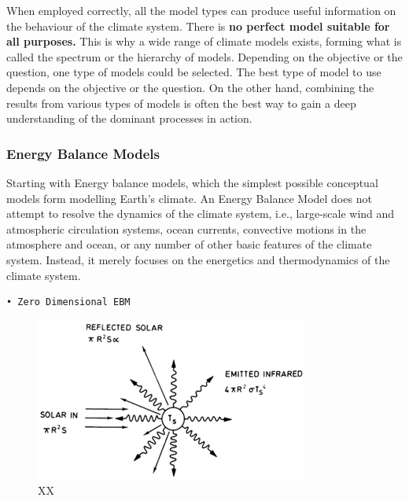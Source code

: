 \documentclass[12pt,oneside]{book}
\begin{document}
When employed correctly, all the model types can produce useful
information on the behaviour of the climate system. There is \textbf{no
perfect model suitable for all purposes.} This is why a wide range of
climate models exists, forming what is called the spectrum or the
hierarchy of models. Depending on the objective or the question, one
type of models could be selected. The best type of model to use depends
on the objective or the question. On the other hand, combining the
results from various types of models is often the best way to gain a
deep understanding of the dominant processes in action.

\subsubsection{Energy Balance Models}\label{energy-balance-models}

Starting with Energy balance models, which the simplest possible
conceptual models form modelling Earth's climate. An Energy Balance
Model does not attempt to resolve the dynamics of the climate system,
i.e., large-scale wind and atmospheric circulation systems, ocean
currents, convective motions in the atmosphere and ocean, or any number
of other basic features of the climate system. Instead, it merely
focuses on the energetics and thermodynamics of the climate system.

\begin{verbatim}
• Zero Dimensional EBM
\end{verbatim}

\begin{figure}

{\centering \includegraphics[width=0.8\linewidth]{figures/Figure79} 

}

\caption{XX}\label{fig:EnergyBalanceModels}
\end{figure}
\end{document}
